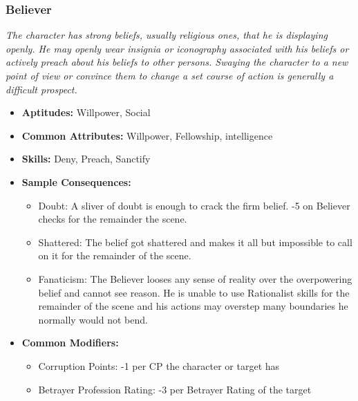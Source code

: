 \subsubsection{Believer}\label{Believer}
\textit{The character has strong beliefs, usually religious ones, that he is displaying openly.
He may openly wear insignia or iconography associated with his beliefs or actively preach about his beliefs to other persons.
Swaying the character to a new point of view or convince them to change a set course of action is generally a difficult prospect.}
\begin{itemize}
	\item \textbf{Aptitudes:} Willpower, Social
	\item \textbf{Common Attributes:} Willpower, Fellowship, intelligence
	\item \textbf{Skills:} Deny, Preach, Sanctify
	\item \textbf{Sample Consequences:} 
	\begin{itemize}
		\item Doubt: A sliver of doubt is enough to crack the firm belief. -5 on Believer checks for the remainder the scene.
		\item Shattered: The belief got shattered and makes it all but impossible to call on it for the remainder of the scene.
		\item Fanaticism: The Believer looses any sense of reality over the overpowering belief and cannot see reason. He is unable to use Rationalist skills for the remainder of the scene and his actions may overstep many boundaries he normally would not bend.
	\end{itemize}
	\item \textbf{Common Modifiers:}
	\begin{itemize}
		\item Corruption Points: -1 per CP the character or target has
		\item Betrayer Profession Rating: -3 per Betrayer Rating of the target
	\end{itemize}
\end{itemize}

